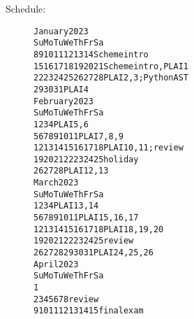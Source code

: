 \documentclass{article}
\newcommand{\myitem}[1]{\item[#1]}
\begin{document}
\begin{description}
\newpage
\myitem{Schedule:}
\begin{alltt} \large
    January 2023
Su Mo Tu We Th Fr Sa
 8  9 10 11 12 13 14  Scheme intro
15 {\color{red}16} 17 18 19 20 21  Scheme intro, PLAI 1
22 23 24 25 26 27 28  PLAI 2,3; Python AST
29 30 31              PLAI 4
    February 2023
Su Mo Tu We Th Fr Sa
          1  2  3  4  PLAI 5,6
 5  6  7  8  9 10 11  PLAI 7,8,9
12 13 14 15 16 17 18  PLAI 10,11; review
19 {\color{red}20 21 22 23 24} 25  holiday
26 27 28              PLAI 12,13
     March 2023
Su Mo Tu We Th Fr Sa
          1  2  3  4  PLAI 13,14
 5  6  7  8  9 10 11  PLAI 15,16,17
12 13 14 15 16 17 18  PLAI 18,19,20
19 20 21 22 23 24 25  review
26 27 28 29 30 31     PLAI 24,25,26
     April 2023
Su Mo Tu We Th Fr Sa
                   1
 2  3  4  5  6  7  8  review
 9 {\color{red}10 11 12 13 14} 15  final exam
\end{alltt}


\end{description}
\end{document}
